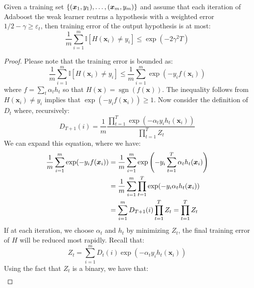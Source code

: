 \begin{theorem}
    Given a training set $\left\{ (\boldsymbol x_1,y_1),\dots,(\boldsymbol x_m, y_m) \right\}$ and assume that each iteration of Adaboost the weak learner reutrns a hypothesis with a weighted error $1/2-\gamma\ge\varepsilon_t$, then training error of the output hypothesis is at most:
    \begin{equation*}
        \frac{1}{m}\sum^m_{i=1}\mathbb{I}[H(\boldsymbol x_i)\ne y_i]\le\exp(-2\gamma^2T)
    \end{equation*}
\end{theorem}
\begin{proof}
    Please note that the training error is bounded as:
    \begin{equation*}
        \frac{1}{m}\sum^m_{i=1}\mathbb{I}[H(\boldsymbol x_i)\ne y_i] \le \frac{1}{m}\sum^m_{i=1}\exp(-y_if(\boldsymbol x_i))
    \end{equation*}
    where $f = \sum_t \alpha_t h_t$ so that $H(\boldsymbol x) = \operatorname{sgn}(f(\boldsymbol x))$. The inequality follows from $H(\boldsymbol x_i) \ne y_i$ implies that $\exp(-y_if(\boldsymbol x_i))\ge1$. Now consider the definition of $D_t$ where, recursively:
    \begin{equation*}
        D_{T+1}(i) = \frac{1}{m}\frac{\prod^T_{t=1}\exp(-\alpha_ty_ih_t(\boldsymbol x_i))}{\prod^T_{t=1}Z_t}
    \end{equation*}
    We can expand this equation, where we have:
    \begin{equation*}
    \begin{aligned}
        \frac{1}{m}\sum^m_{i=1}\exp(-y_if(\boldsymbol x_i)) &= \frac{1}{m}\sum^m_{i=1}\exp\left( -y_i\sum^T_{t=1}\alpha_th_t(\boldsymbol x_i) \right) \\
        &= \frac{1}{m}\sum^m_{i=1}\prod^T_{t=1}\exp(-y_i\alpha_th_t(\boldsymbol x_i)) \\
        &= \sum^m_{i=1}D_{T+1}(i)\prod^T_{t=1}Z_t = \prod^T_{t=1}Z_t
    \end{aligned} 
    \end{equation*}
    If at each iteration, we choose $\alpha_t$ and $h_t$ by minimizing $Z_t$, the final training error of $H$ will be reduced most rapidly. Recall that:
    \begin{equation*}
        Z_t = \sum^m_{i=1}D_t(i)\exp(-\alpha_ty_ih_t(\boldsymbol x_i))
    \end{equation*}
    Using the fact that $Z_t$ is a binary, we have that:
    \begin{equation*}
    \begin{aligned}

\end{aligned}
\end{equation*}
\end{proof}

